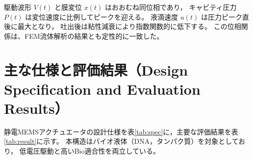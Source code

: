 \documentclass[conference]{IEEEtran}
\begin{document}
駆動波形 $V(t)$ と膜変位 $x(t)$ はおおむね同位相であり，
キャビティ圧力 $P(t)$ は変位速度に比例してピークを迎える。
液滴速度 $u(t)$ は圧力ピーク直後に最大となり，
吐出後は粘性減衰により指数関数的に低下する。
この位相関係は、FEM流体解析の結果とも定性的に一致した。

\section{主な仕様と評価結果（Design Specification and Evaluation Results）}
静電MEMSアクチュエータの設計仕様を表\ref{tab:spec}に，主要な評価結果を表\ref{tab:result}に示す。
本構造はバイオ液体（DNA，タンパク質）を対象としており，
低電圧駆動と高いBio適合性を両立している。

\begin{table}[t]
\centering
\caption{主要設計仕様（Target Design Specification）}
\label{tab:spec}
\end{table}
\end{document}
